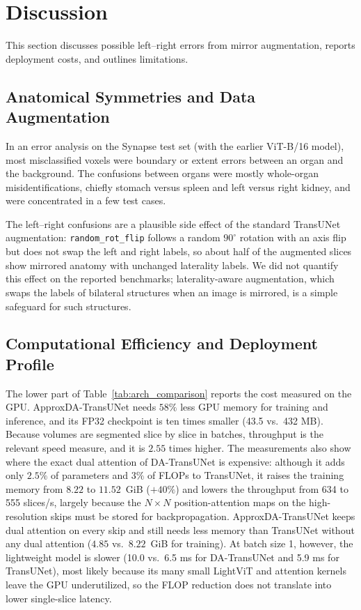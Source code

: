 \section{Discussion}
\label{sec:discussion}

This section discusses possible left--right errors from mirror augmentation, reports deployment costs, and outlines limitations.

\subsection{Anatomical Symmetries and Data Augmentation}
\label{sec:symmetry}
In an error analysis on the Synapse test set (with the earlier ViT-B/16 model), most misclassified voxels were boundary or extent errors between an organ and the background. The confusions between organs were mostly whole-organ misidentifications, chiefly stomach versus spleen and left versus right kidney, and were concentrated in a few test cases.

The left--right confusions are a plausible side effect of the standard TransUNet augmentation: \texttt{random\_rot\_flip} follows a random $90^\circ$ rotation with an axis flip but does not swap the left and right labels, so about half of the augmented slices show mirrored anatomy with unchanged laterality labels. We did not quantify this effect on the reported benchmarks; laterality-aware augmentation, which swaps the labels of bilateral structures when an image is mirrored, is a simple safeguard for such structures.

\subsection{Computational Efficiency and Deployment Profile}

The lower part of Table~\ref{tab:arch_comparison} reports the cost measured on the GPU. ApproxDA-TransUNet needs $58\%$ less GPU memory for training and inference, and its FP32 checkpoint is ten times smaller (43.5 vs.\ 432 MB). Because volumes are segmented slice by slice in batches, throughput is the relevant speed measure, and it is $2.55$ times higher. The measurements also show where the exact dual attention of DA-TransUNet is expensive: although it adds only $2.5\%$ of parameters and $3\%$ of FLOPs to TransUNet, it raises the training memory from $8.22$ to $11.52$~GiB ($+40\%$) and lowers the throughput from 634 to 555 slices/s, largely because the $N \times N$ position-attention maps on the high-resolution skips must be stored for backpropagation. ApproxDA-TransUNet keeps dual attention on every skip and still needs less memory than TransUNet without any dual attention ($4.85$ vs.\ $8.22$~GiB for training). At batch size 1, however, the lightweight model is slower (10.0 vs.\ 6.5 ms for DA-TransUNet and 5.9 ms for TransUNet), most likely because its many small LightViT and attention kernels leave the GPU underutilized, so the FLOP reduction does not translate into lower single-slice latency.


